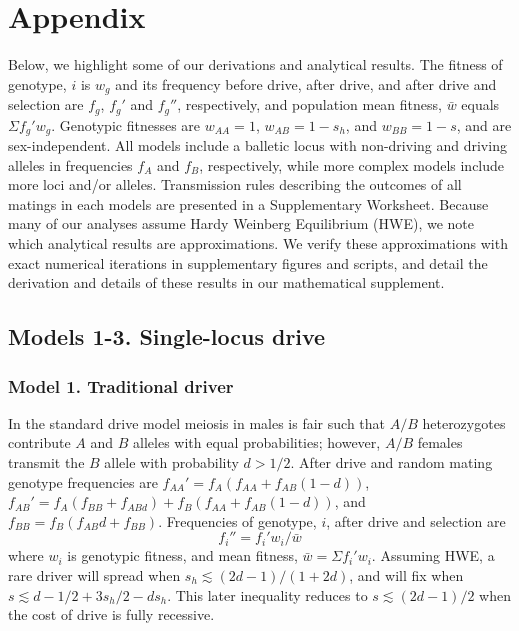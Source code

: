 \documentclass[12pt,letterpaper]{article}
\newcommand{\yb}[1]{{ \color{blue} #1}}
\begin{document}
\section*{Appendix}
Below, we highlight some of our derivations and analytical results. 
The fitness of genotype, $i$ is $w_g$ and its frequency before drive, after drive, and after drive and selection are $f_g$, $f_g'$ and $f_g''$, respectively, and population mean fitness,  $\bar{w}$ equals  $\Sigma f_g'w_g$. Genotypic fitnesses are $w_{AA} = 1$, $w_{AB} = 1-s_h$, and $w_{BB}=1-s$, and are sex-independent. 
All models include a balletic locus with non-driving and driving alleles in frequencies $f_A$ and $f_B$, respectively, while more complex models include more loci and/or alleles.  
Transmission rules describing the outcomes of all matings in each models are presented in a \yb{Supplementary Worksheet}.  
Because many of our analyses assume Hardy Weinberg Equilibrium (HWE), we note which analytical results are approximations. 
We verify these approximations with exact numerical iterations in supplementary figures and scripts, and detail the derivation and details of these results in our mathematical supplement. 

\subsection*{Models 1-3. Single-locus drive}
\subsubsection*{Model 1. Traditional driver}
In the standard drive model meiosis in males is fair such that $A/B$ heterozygotes contribute $A$ and $B$ alleles with equal probabilities; however, $A/B$ females transmit the $B$ allele with probability $d>1/2$. 
After drive and random mating genotype frequencies are 
	$f_{AA}'=f_A (f_{AA }+ f_{AB} (1 - d))$, 
	$f_{AB}'=f_A (f_{BB} + f_{ABd}) + f_B (f_{AA} + f_{AB} (1 - d))$,
	and $f_{BB}= f_B (f_{AB} d + f_{BB})$. 
Frequencies of genotype, $i$, after drive and selection are 
	\begin{equation} f_i''= f_i'w_i/\bar{w}\end{equation}
	where $w_i$ is genotypic fitness, and mean fitness, $\bar{w} = \Sigma f_i'w_i$. 
	Assuming HWE, a rare driver will spread when $s_h \lesssim(2d-1)/(1+2d)$, and will fix when $s\lesssim d -1/2 + 3 s_h /2- d s_h$. This later inequality reduces to $s\lesssim(2d-1)/2$ when the cost of drive is fully recessive. 
	
\end{document}
